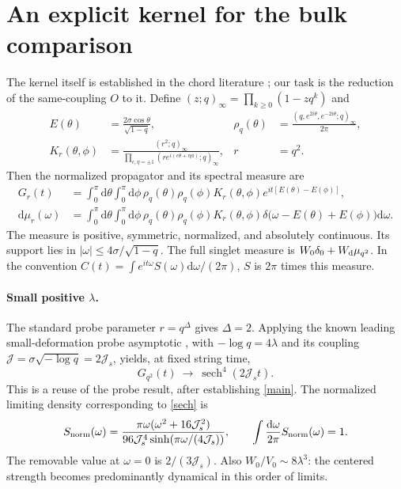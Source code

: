 \documentclass[11pt,a4paper]{article}
\newcommand{\Js}{\mathcal J_s}
\newcommand{\dd}{\mathrm d}
\newcommand{\sech}{\operatorname{sech}}
\begin{document}
\newpage
\section{An explicit kernel for the bulk comparison}
The kernel itself is established in the chord literature
\cite{bint,bnr}; our task is the reduction of the same-coupling $O$ to it.
Define $(z;q)_\infty=\prod_{k\ge0}(1-zq^k)$ and
\begin{align}
 E(\theta)&=\frac{2\sigma\cos\theta}{\sqrt{1-q}},&
 \rho_q(\theta)&=\frac{(q,e^{2i\theta},e^{-2i\theta};q)_\infty}{2\pi},\\
 K_r(\theta,\phi)&=
 \frac{(r^2;q)_\infty}
 {\prod_{\epsilon,\eta=\pm1}(r e^{i(\epsilon\theta+\eta\phi)};q)_\infty},
 &r&=q^2 .
\end{align}
Then the normalized propagator and its spectral measure are
\begin{align}
 G_r(t)&=\int_0^\pi\!\dd\theta\int_0^\pi\!\dd\phi\,
 \rho_q(\theta)\rho_q(\phi)K_r(\theta,\phi)
 e^{it[E(\theta)-E(\phi)]},\label{kernel}\\
 \dd\mu_r(\omega)&=\int_0^\pi\!\dd\theta\int_0^\pi\!\dd\phi\,
 \rho_q(\theta)\rho_q(\phi)K_r(\theta,\phi)
 \delta\bigl(\omega-E(\theta)+E(\phi)\bigr)\dd\omega .
\end{align}
The measure is positive, symmetric, normalized, and absolutely continuous.
Its support lies in $|\omega|\le4\sigma/\sqrt{1-q}$.
The full singlet measure is $W_0\delta_0+W_{\rm d}\mu_{q^2}$.
In the convention $C(t)=\int e^{it\omega}S(\omega)\dd\omega/(2\pi)$,
$S$ is $2\pi$ times this measure.

\paragraph{Small positive $\lambda$.}
The standard probe parameter $r=q^\Delta$ gives $\Delta=2$.
Applying the known leading small-deformation probe asymptotic
\cite{mukh}, with $-\log q=4\lambda$ and its coupling
$\mathcal J=\sigma\sqrt{-\log q}=2\Js$, yields, at fixed string time,
\begin{equation}
 G_{q^2}(t)\ \longrightarrow\ \sech^4(2\Js t).\label{sech}
\end{equation}
This is a reuse of the probe result, after establishing \eqref{main}.
The normalized limiting density corresponding to \eqref{sech} is
\begin{equation}
 S_{\rm norm}(\omega)=
 \frac{\pi\omega(\omega^2+16\Js^2)}{96\Js^4\sinh(\pi\omega/(4\Js))},
 \qquad \int\frac{\dd\omega}{2\pi}S_{\rm norm}(\omega)=1.
\end{equation}
The removable value at $\omega=0$ is $2/(3\Js)$.
Also $W_0/V_0\sim8\lambda^3$: the centered strength becomes predominantly
dynamical in this order of limits.
\end{document}
